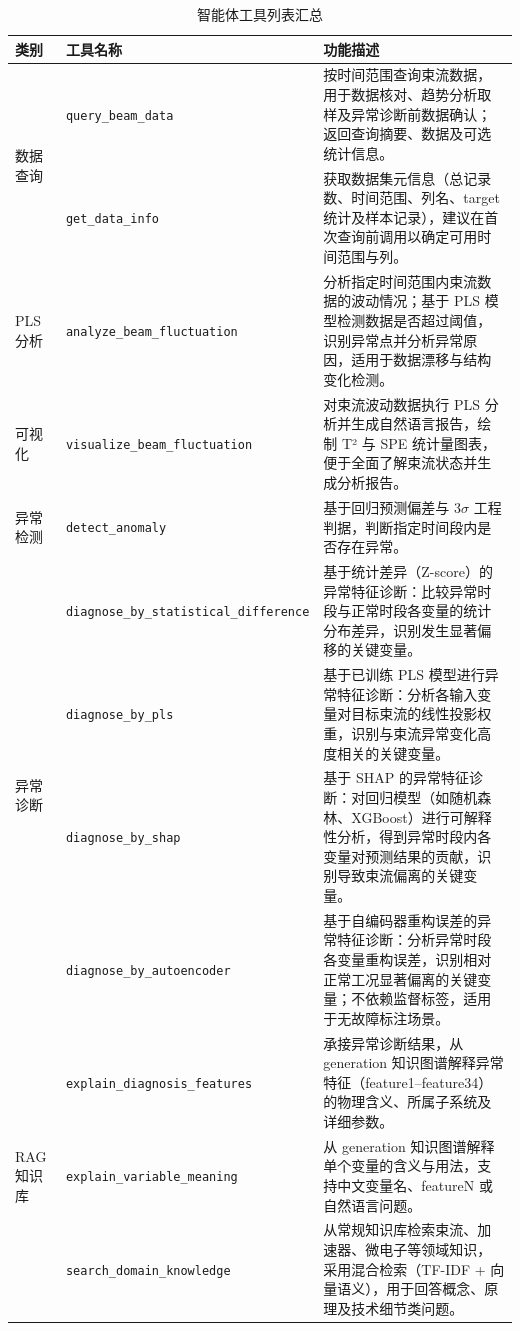 
\begin{table}[htbp]
  \centering
  \caption{智能体工具列表汇总}
  \label{tab:tools-summary}
  \small
  \begin{tabular}{llp{8.5cm}}
    \toprule
    \textbf{类别} & \textbf{工具名称} & \textbf{功能描述} \\
    \midrule
    \multirow{2}{*}{数据查询} & \texttt{query\_beam\_data} & 按时间范围查询束流数据，用于数据核对、趋势分析取样及异常诊断前数据确认；返回查询摘要、数据及可选统计信息。 \\
    \cmidrule(lr){2-3}
    & \texttt{get\_data\_info} & 获取数据集元信息（总记录数、时间范围、列名、target 统计及样本记录），建议在首次查询前调用以确定可用时间范围与列。 \\
    \midrule
    PLS 分析 & \texttt{analyze\_beam\_fluctuation} & 分析指定时间范围内束流数据的波动情况；基于 PLS 模型检测数据是否超过阈值，识别异常点并分析异常原因，适用于数据漂移与结构变化检测。 \\
    \midrule
    可视化 & \texttt{visualize\_beam\_fluctuation} & 对束流波动数据执行 PLS 分析并生成自然语言报告，绘制 T² 与 SPE 统计量图表，便于全面了解束流状态并生成分析报告。 \\
    \midrule
    异常检测 & \texttt{detect\_anomaly} & 基于回归预测偏差与 3$\sigma$ 工程判据，判断指定时间段内是否存在异常。 \\
    \midrule
    \multirow{4}{*}{异常诊断} & \texttt{diagnose\_by\_statistical\_difference} & 基于统计差异（Z-score）的异常特征诊断：比较异常时段与正常时段各变量的统计分布差异，识别发生显著偏移的关键变量。 \\
    \cmidrule(lr){2-3}
    & \texttt{diagnose\_by\_pls} & 基于已训练 PLS 模型进行异常特征诊断：分析各输入变量对目标束流的线性投影权重，识别与束流异常变化高度相关的关键变量。 \\
    \cmidrule(lr){2-3}
    & \texttt{diagnose\_by\_shap} & 基于 SHAP 的异常特征诊断：对回归模型（如随机森林、XGBoost）进行可解释性分析，得到异常时段内各变量对预测结果的贡献，识别导致束流偏离的关键变量。 \\
    \cmidrule(lr){2-3}
    & \texttt{diagnose\_by\_autoencoder} & 基于自编码器重构误差的异常特征诊断：分析异常时段各变量重构误差，识别相对正常工况显著偏离的关键变量；不依赖监督标签，适用于无故障标注场景。 \\
    \midrule
    \multirow{3}{*}{RAG 知识库} & \texttt{explain\_diagnosis\_features} & 承接异常诊断结果，从 generation 知识图谱解释异常特征（feature1--feature34）的物理含义、所属子系统及详细参数。 \\
    \cmidrule(lr){2-3}
    & \texttt{explain\_variable\_meaning} & 从 generation 知识图谱解释单个变量的含义与用法，支持中文变量名、featureN 或自然语言问题。 \\
    \cmidrule(lr){2-3}
    & \texttt{search\_domain\_knowledge} & 从常规知识库检索束流、加速器、微电子等领域知识，采用混合检索（TF-IDF + 向量语义），用于回答概念、原理及技术细节类问题。 \\
    \bottomrule
  \end{tabular}
\end{table}
